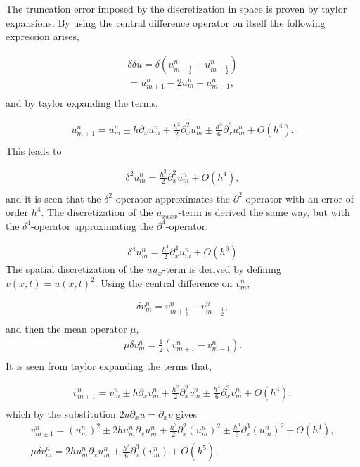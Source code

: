 The truncation error imposed by the discretization in space is proven by taylor expansions. By using the central difference operator on itself the following expression arises,

\begin{align*}
\delta \delta u = \delta (u_{m+\frac{1}{2}}^n - u_{m-\frac{1}{2}}^ {n}) \\
= u_{m+1}^n -2u_m^n + u_{m-1}^n, \\
\end{align*}
and by taylor expanding the terms,

\begin{align*}
u_{m \pm 1}^n = u_m^n \pm h\partial_xu_m^n + \frac{h^2}{2}\partial_x^2u_m^n \pm \frac{h^3}{6}\partial_x^3u_m^n + O(h^4). \\
\end{align*}
This leads to

\begin{align*}
\delta^2 u_m^n = \frac{h^2}{2}\partial_x^2 u_m^n + O(h^4), \\
\end{align*}
and it is seen that the $\delta^2$-operator approximates the $\partial^2$-operator with an error of order $h^4$. The discretization of the $u_{xxxx}$-term is derived the same way, but with the $\delta^4$-operator approximating the $\partial^4$-operator:

\begin{align*}
\delta^4 u_m^n = \frac{h^4}{2}\partial_x^4 u_m^n + O(h^6)
\end{align*}
The spatial discretization of the $uu_{x}$-term is derived by defining $v(x,t) = u(x,t)^2$. Using the central difference on $v_{m}^n$,

\begin{align*}
\delta v_m^n = v_{m+\frac{1}{2}}^n - v_{m-\frac{1}{2}}^n, \\
\end{align*}
and then the mean operator $\mu$,
\begin{align*}
\mu\delta v_m^n = \frac{1}{2}(v_{m+1}^n - v_{m-1}^n). \\
\end{align*}
It is seen from taylor expanding the terms that,

\begin{align*}
v_{m \pm 1}^n = v_m^n \pm h\partial_xv_m^n + \frac{h^2}{2}\partial_x^2v_m^n \pm \frac{h^3}{6}\partial_x^3v_m^n + O(h^4), \\
\end{align*}
which by the substitution $2u\partial_xu = \partial_xv$ gives
\begin{align*}
v_{m \pm 1}^n = (u_m^n)^2 \pm 2hu_m^n\partial_xu_m^n + \frac{h^2}{2}\partial_x^2(u_m^n)^2 \pm \frac{h^3}{6}\partial_x^3(u_m^n)^2 + O(h^4), \\
\mu \delta v_m^n = 2hu_m^n\partial_xu_m^n + \frac{h^3}{6}\partial_{x}^3(v_m^n) + O(h^5). \\
\end{align*}

